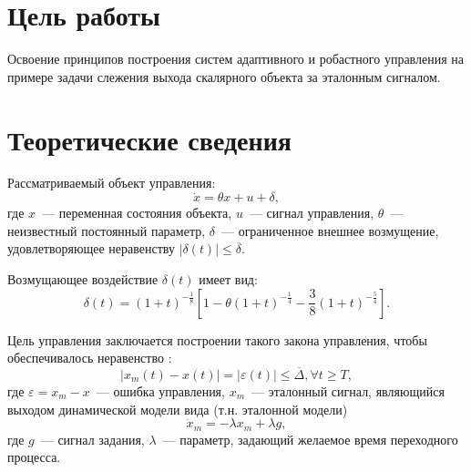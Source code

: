 \section{Цель работы}
Освоение принципов построения систем адаптивного и робастного управления на примере задачи слежения выхода скалярного объекта за эталонным сигналом.

\section{Теоретические сведения}
Рассматриваемый объект управления:
\begin{equation}
    \dot{x} = \theta x + u + \delta,
\end{equation}
где $x$~--- переменная состояния объекта, $u$~--- сигнал управления, $\theta$~--- неизвестный постоянный параметр, $\delta$~--- ограниченное внешнее возмущение, удовлетворяющее неравенству $|\delta(t)| \le \overline{\delta}$.

Возмущающее воздействие $\delta(t)$ имеет вид:
\begin{equation}\label{eq_delta}
	\delta(t) = (1 + t)^{-\frac{1}{8}} \left[1 - \theta (1 + t)^{-\frac{1}{4}} - \frac{3}{8} (1 + t)^{-\frac{5}{4}}\right].
\end{equation}

Цель управления заключается построении такого закона управления, чтобы обеспечивалось неравенство :
\begin{equation}\label{eq_goal_of_control}
	|x_m(t) - x(t)| = |\varepsilon(t)| \le \overline{\Delta}, \forall{t} \ge T,
\end{equation}
где $\varepsilon = x_m - x$~--- ошибка управления, $x_m$~--- эталонный сигнал, являющийся выходом динамической модели вида (т.н. эталонной модели)
\begin{equation}
    \dot{x}_m = - \lambda x_m + \lambda g,
\end{equation}
где $g$~--- сигнал задания, $\lambda$~--- параметр, задающий желаемое время переходного процесса.

